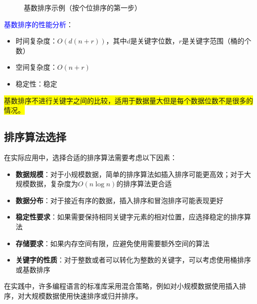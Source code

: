 \documentclass{../../note}
\begin{document}
\begin{figure}[h]
  \centering
  \caption{基数排序示例（按个位排序的第一步）}
\end{figure}

\textcolor{blue}{基数排序的性能分析}：
\begin{itemize}
  \item 时间复杂度：$O(d(n+r))$，其中$d$是关键字位数，$r$是关键字范围（桶的个数）
  \item 空间复杂度：$O(n+r)$
  \item 稳定性：稳定
\end{itemize}

\colorbox{yellow}{基数排序不进行关键字之间的比较，适用于数据量大但是每个数据位数不是很多的情况。}

\subsection{排序算法选择}

在实际应用中，选择合适的排序算法需要考虑以下因素：

\begin{itemize}
  \item \textbf{数据规模}：对于小规模数据，简单的排序算法如插入排序可能更高效；对于大规模数据，复杂度为$O(n\log{n})$的排序算法更合适
  \item \textbf{数据分布}：对于接近有序的数据，插入排序和冒泡排序可能表现更好
  \item \textbf{稳定性要求}：如果需要保持相同关键字元素的相对位置，应选择稳定的排序算法
  \item \textbf{存储要求}：如果内存空间有限，应避免使用需要额外空间的算法
  \item \textbf{关键字的性质}：对于整数或者可以转化为整数的关键字，可以考虑使用桶排序或基数排序
\end{itemize}

在实践中，许多编程语言的标准库采用混合策略，例如对小规模数据使用插入排序，对大规模数据使用快速排序或归并排序。
\end{document}
